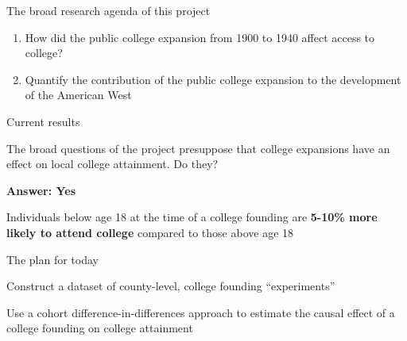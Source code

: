 \documentclass[notes,11pt, aspectratio=169]{beamer}
\newenvironment{wideitemize}{\itemize\addtolength{\itemsep}{10pt}}{\enditemize}
\begin{document}
\begin{frame}{The broad research agenda of this project}
  \begin{enumerate}
    \item How did the public college expansion from 1900 to 1940 affect access to college?
    \item Quantify the contribution of the public college expansion to the development of the American West
  \end{enumerate}
\end{frame}



\begin{frame}{Current results}
\begin{wideitemize}
\item The broad questions of the project presuppose that college expansions have an effect on local college attainment. Do they?
\item \textbf{Answer: Yes}
\item Individuals below age 18 at the time of a college founding are \textbf{5-10\% more likely to attend college} compared to those above age 18
\end{wideitemize}
\end{frame}

\begin{frame}{The plan for today}
  \begin{wideitemize}
    \item Construct a dataset of county-level, college founding ``experiments''
    \item Use a cohort difference-in-differences approach to estimate the causal effect of a college founding on college attainment
  \end{wideitemize}
\end{frame}
\end{document}

